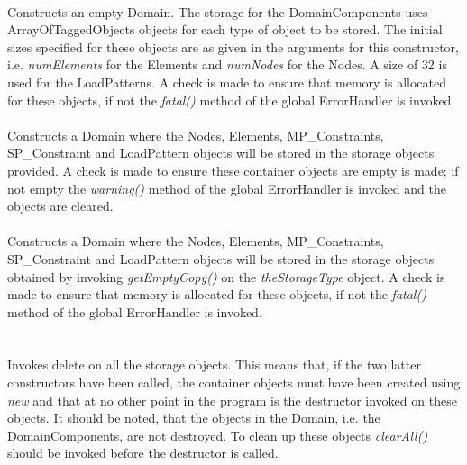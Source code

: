   \\ 
Constructs an empty Domain. The storage for the DomainComponents uses
ArrayOfTaggedObjects objects for each type of object to be stored. The
initial sizes specified for these objects are as given in the
arguments for this constructor, i.e. {\em numElements} for the
Elements and {\em numNodes} for the Nodes. A size of 32 is used for
the LoadPatterns. A check is made to ensure that memory
is allocated for these objects, if not the {\em fatal()} method of the
global ErrorHandler is invoked.\\   


 \\
Constructs a Domain where the Nodes, Elements, MP\_Constraints,
SP\_Constraint and LoadPattern objects will be
stored in the storage objects provided. A check is made to ensure
these container objects are empty is made; if not empty the {\em warning()}
method of the global ErrorHandler is invoked and the objects are
cleared. \\

 \\
Constructs a Domain where the Nodes, Elements, MP\_Constraints,
SP\_Constraint and LoadPattern objects will be stored in the storage
objects obtained by invoking {\em getEmptyCopy()} on the {\em
theStorageType} object. A check is made to ensure that memory is
allocated for these objects, if not the {\em fatal()} method of the
global ErrorHandler is invoked.\\    

  \\
  \\
Invokes delete on all the storage objects. This means that, if the two
latter constructors have been called, the container objects must have 
been created using {\em new} and that at no other point in the program
is the destructor invoked on these objects. It should be noted, that
the objects in the Domain, i.e. the DomainComponents, are not
destroyed. To clean up these objects {\em clearAll()} should be
invoked before the destructor is called. \\

